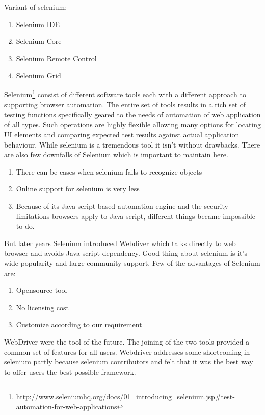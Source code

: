 \documentclass[article,type=msc,colorback,accentcolor=tud9c,twoside,11pt]{tudthesis}
\begin{document}
Variant of selenium:
\begin{enumerate}
\item Selenium IDE
\item Selenium Core
\item Selenium Remote Control
\item Selenium Grid
\end{enumerate}

Selenium\footnote{http://www.seleniumhq.org/docs/01\_introducing\_selenium.jsp\#test-automation-for-web-applications} consist of different software tools each with a different approach to supporting browser automation. The entire set of tools results in a rich set of testing functions specifically geared to the needs of automation of web application of all types. Such operations are highly flexible allowing many options for locating UI elements and comparing expected test results against actual application behaviour. While selenium is a tremendous tool it isn't without drawbacks.
There are also few downfalls of Selenium which is important to maintain here.
\begin{enumerate}
	\item	There can be cases when selenium fails to recognize objects
	\item Online support for selenium is very less
	\item Because of its Java-script based automation engine and the security limitations browsers apply to Java-script, different things became impossible to do.
\end{enumerate}
 But later years Selenium introduced Webdiver which talks directly to web browser and avoids Java-script dependency. Good thing about selenium is it's wide popularity and large community support. Few of the advantages of Selenium are:
 \begin{enumerate}
 	\item Opensource tool
 	\item No licensing cost
 	\item Customize according to our requirement
 \end{enumerate}
  WebDriver were the tool of the future. The joining of the two tools provided a common set of features for all users. Webdriver addresses some shortcoming in selenium partly because selenium contributors and felt that it was the best way to offer users the best possible framework.
\end{document}
